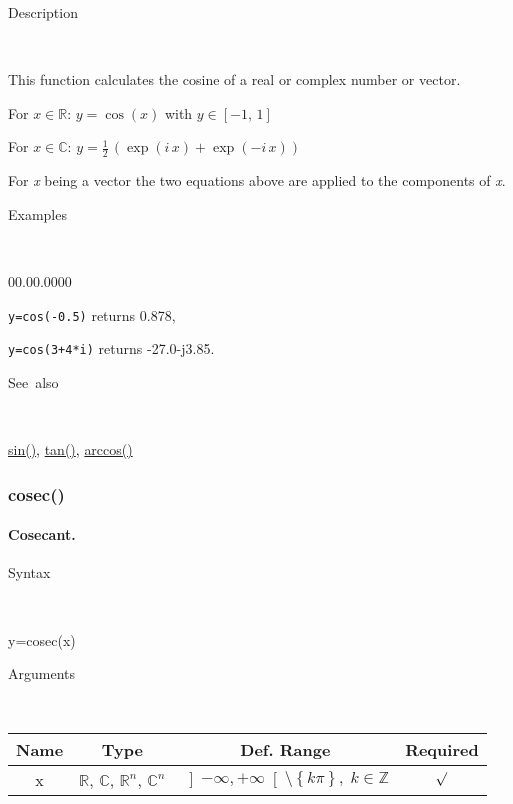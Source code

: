 \begin{description}
\item [Description]~
\end{description}
This function calculates the cosine of a real or complex number or
vector.

\medskip{}
For $x\in\mathbb{R}$: $y=\cos\left(x\right)$ with $y\in\left[-1,\,1\right]$

\medskip{}
For $x\in\mathbb{C}$: $y=\frac{1}{2}\,\left(\exp\left(i\, x\right)+\exp\left(-i\, x\right)\right)$
\medskip{}

\noindent For \textit{x} being a vector the two equations above are
applied to the components of \textit{x}.

\begin{description}
\item [Examples]~
\end{description}
\begin{lyxlist}{00.00.0000}
\item [\texttt{y=cos(-0.5)}]returns 0.878,
\item [\texttt{y=cos(3+4{*}i)}]returns -27.0-j3.85.
\end{lyxlist}
\begin{description}
\item [See~also]~
\end{description}
\textcolor{blue}{\hyperlink{sin}{sin()}}\textcolor{black}{,} \textcolor{blue}{\hyperlink{tan}{tan()}}\textcolor{black}{,}
\textcolor{blue}{\hyperlink{arccos}{arccos()}}


\newpage
\subsubsection*{\hypertarget{cosec}{}{\Large cosec()}}


\paragraph{\label{par:Cosecant}Cosecant.}

\begin{description}
\item [Syntax]~
\end{description}
y=cosec(x)

\begin{description}
\item [Arguments]~
\end{description}
\begin{tabular}{|c|c|c|c|}
\hline 
Name&
Type&
Def. Range&
Required\tabularnewline
\hline
\hline 
x&
$\mathbb{R}$, $\mathbb{C}$, $\mathbb{R}^{n}$, $\mathbb{C}^{n}$&
$\left]-\infty,+\infty\right[\setminus\left\{ k\pi\right\} ,\; k\in\mathbb{Z}$&
$\surd$\tabularnewline
\hline
\end{tabular}

